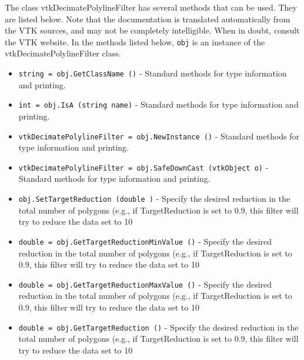 The class vtkDecimatePolylineFilter has several methods that can be used.
  They are listed below.
Note that the documentation is translated automatically from the VTK sources,
and may not be completely intelligible.  When in doubt, consult the VTK website.
In the methods listed below, \verb|obj| is an instance of the vtkDecimatePolylineFilter class.
\begin{itemize}
\item  \verb|string = obj.GetClassName ()| -  Standard methods for type information and printing.

\item  \verb|int = obj.IsA (string name)| -  Standard methods for type information and printing.

\item  \verb|vtkDecimatePolylineFilter = obj.NewInstance ()| -  Standard methods for type information and printing.

\item  \verb|vtkDecimatePolylineFilter = obj.SafeDownCast (vtkObject o)| -  Standard methods for type information and printing.

\item  \verb|obj.SetTargetReduction (double )| -  Specify the desired reduction in the total number of polygons (e.g., if
 TargetReduction is set to 0.9, this filter will try to reduce the data set
 to 10%

\item  \verb|double = obj.GetTargetReductionMinValue ()| -  Specify the desired reduction in the total number of polygons (e.g., if
 TargetReduction is set to 0.9, this filter will try to reduce the data set
 to 10%

\item  \verb|double = obj.GetTargetReductionMaxValue ()| -  Specify the desired reduction in the total number of polygons (e.g., if
 TargetReduction is set to 0.9, this filter will try to reduce the data set
 to 10%

\item  \verb|double = obj.GetTargetReduction ()| -  Specify the desired reduction in the total number of polygons (e.g., if
 TargetReduction is set to 0.9, this filter will try to reduce the data set
 to 10%

\end{itemize}
